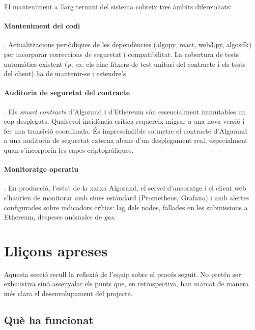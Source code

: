El manteniment a llarg termini del sistema cobreix tres àmbits diferenciats:

\paragraph{Manteniment del codi}.
Actualitzacions periòdiques de les dependències (algopy, react, web3.py, algosdk) per incorporar correccions de
seguretat i compatibilitat.
La cobertura de tests automàtics existent (\emph{p. ex.} els cinc fitxers de test unitari del contracte i els tests del
client) ha de mantenir-se i estendre's.

\paragraph{Auditoria de seguretat del contracte}.
Els \emph{smart contracts} d'Algorand i d'Ethereum són essencialment immutables un cop desplegats.
Qualsevol incidència crítica requereix migrar a una nova versió i fer una transició coordinada.
És imprescindible sotmetre el contracte d'Algorand a una auditoria de seguretat externa abans d'un desplegament real,
especialment quan s'incorporin les capes criptogràfiques.

\paragraph{Monitoratge operatiu}.
En producció, l'estat de la xarxa Algorand, el servei d'ancoratge i el client web s'haurien de monitorar amb eines
estàndard (Prometheus, Grafana) i amb alertes configurades sobre indicadors crítics: lag dels nodes, fallades en les
submissions a Ethereum, despeses anòmales de \emph{gas}.



\section{Lliçons apreses}
\label{sec:llicons}

Aquesta secció recull la reflexió de l'equip sobre el procés seguit.
No pretén ser exhaustiva sinó assenyalar els punts que, en retrospectiva, han marcat de manera més clara el
desenvolupament del projecte.

\subsection{Què ha funcionat}
\label{subsec:que-ha-funcionat}

